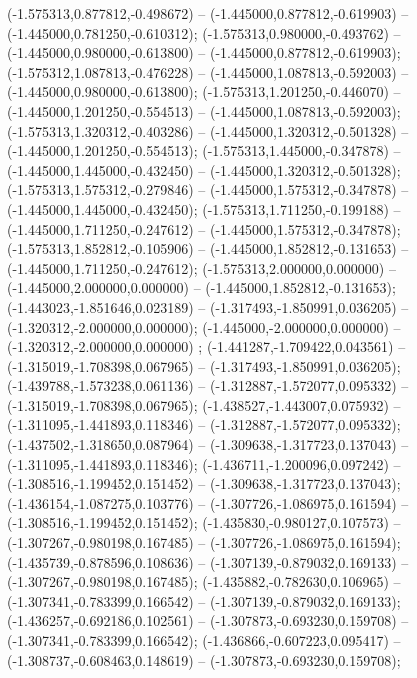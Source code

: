  (-1.575313,0.877812,-0.498672) -- (-1.445000,0.877812,-0.619903) -- (-1.445000,0.781250,-0.610312);
 (-1.575313,0.980000,-0.493762) -- (-1.445000,0.980000,-0.613800) -- (-1.445000,0.877812,-0.619903);
 (-1.575312,1.087813,-0.476228) -- (-1.445000,1.087813,-0.592003) -- (-1.445000,0.980000,-0.613800);
 (-1.575313,1.201250,-0.446070) -- (-1.445000,1.201250,-0.554513) -- (-1.445000,1.087813,-0.592003);
 (-1.575313,1.320312,-0.403286) -- (-1.445000,1.320312,-0.501328) -- (-1.445000,1.201250,-0.554513);
 (-1.575313,1.445000,-0.347878) -- (-1.445000,1.445000,-0.432450) -- (-1.445000,1.320312,-0.501328);
 (-1.575313,1.575312,-0.279846) -- (-1.445000,1.575312,-0.347878) -- (-1.445000,1.445000,-0.432450);
 (-1.575313,1.711250,-0.199188) -- (-1.445000,1.711250,-0.247612) -- (-1.445000,1.575312,-0.347878);
 (-1.575313,1.852812,-0.105906) -- (-1.445000,1.852812,-0.131653) -- (-1.445000,1.711250,-0.247612);
 (-1.575313,2.000000,0.000000) -- (-1.445000,2.000000,0.000000) -- (-1.445000,1.852812,-0.131653);
 (-1.443023,-1.851646,0.023189) -- (-1.317493,-1.850991,0.036205) -- (-1.320312,-2.000000,0.000000);
 (-1.445000,-2.000000,0.000000) -- (-1.320312,-2.000000,0.000000) ;
 (-1.441287,-1.709422,0.043561) -- (-1.315019,-1.708398,0.067965) -- (-1.317493,-1.850991,0.036205);
 (-1.439788,-1.573238,0.061136) -- (-1.312887,-1.572077,0.095332) -- (-1.315019,-1.708398,0.067965);
 (-1.438527,-1.443007,0.075932) -- (-1.311095,-1.441893,0.118346) -- (-1.312887,-1.572077,0.095332);
 (-1.437502,-1.318650,0.087964) -- (-1.309638,-1.317723,0.137043) -- (-1.311095,-1.441893,0.118346);
 (-1.436711,-1.200096,0.097242) -- (-1.308516,-1.199452,0.151452) -- (-1.309638,-1.317723,0.137043);
 (-1.436154,-1.087275,0.103776) -- (-1.307726,-1.086975,0.161594) -- (-1.308516,-1.199452,0.151452);
 (-1.435830,-0.980127,0.107573) -- (-1.307267,-0.980198,0.167485) -- (-1.307726,-1.086975,0.161594);
 (-1.435739,-0.878596,0.108636) -- (-1.307139,-0.879032,0.169133) -- (-1.307267,-0.980198,0.167485);
 (-1.435882,-0.782630,0.106965) -- (-1.307341,-0.783399,0.166542) -- (-1.307139,-0.879032,0.169133);
 (-1.436257,-0.692186,0.102561) -- (-1.307873,-0.693230,0.159708) -- (-1.307341,-0.783399,0.166542);
 (-1.436866,-0.607223,0.095417) -- (-1.308737,-0.608463,0.148619) -- (-1.307873,-0.693230,0.159708);
